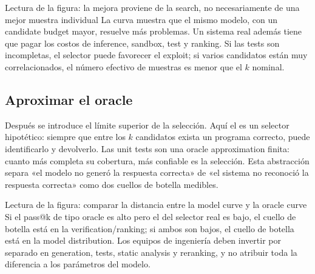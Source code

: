 
\begin{knowledgebox}{Lectura de la figura: la mejora proviene de la search, no necesariamente de una mejor muestra individual}
La curva muestra que el mismo modelo, con un candidate budget mayor, resuelve más problemas. Un sistema real además tiene que pagar los costos de inference, sandbox, test y ranking. Si las tests son incompletas, el selector puede favorecer el exploit; si varios candidatos están muy correlacionados, el número efectivo de muestras es menor que el $k$ nominal.
\end{knowledgebox}


\subsection{Aproximar el oracle}

Después se introduce el límite superior de la selección. Aquí el  es un selector hipotético: siempre que entre los $k$ candidatos exista un programa correcto, puede identificarlo y devolverlo. Las unit tests son una oracle approximation finita: cuanto más completa su cobertura, más confiable es la selección. Esta abstracción separa «el modelo no generó la respuesta correcta» de «el sistema no reconoció la respuesta correcta» como dos cuellos de botella medibles.


\begin{knowledgebox}{Lectura de la figura: comparar la distancia entre la model curve y la oracle curve}
Si el pass@k de tipo oracle es alto pero el del selector real es bajo, el cuello de botella está en la verification/ranking; si ambos son bajos, el cuello de botella está en la model distribution. Los equipos de ingeniería deben invertir por separado en generation, tests, static analysis y reranking, y no atribuir toda la diferencia a los parámetros del modelo.
\end{knowledgebox}

